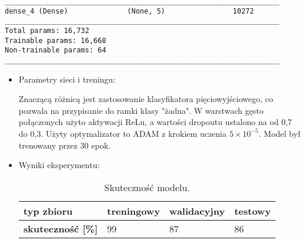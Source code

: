 {\newsavebox\myvff
\begin{lrbox}{\myvff}
\setlength{\myminipagewidth}{0.9\linewidth} %
\setlength{\myminipagecentering}{(\linewidth-\myminipagewidth)/2}
\noindent\hspace{\myminipagecentering}\begin{minipage}{\myminipagewidth}
\begin{verbatim}
_________________________________________________________________
dense_4 (Dense)              (None, 5)                10272     
_________________________________________________________________
Total params: 16,732
Trainable params: 16,668
Non-trainable params: 64
_________________________________________________________________
\end{verbatim} 
\end{minipage}\end{lrbox}
\resizebox{0.75\textwidth}{!}{\usebox\myvff}

\begin{itemize}
\item Parametry sieci i treningu:

Znaczącą różnicą jest zastosowanie klasyfikatora pięciowyjściowego, co pozwala na przypisanie do ramki klasy "żadna". W warstwach gęsto połączonych użyto aktywacji ReLu, a wartości dropoutu ustalono na od 0,7 do 0,3. Użyty optymalizator to ADAM z krokiem uczenia \(5 \times 10^{-5}\). Model był trenowany przez 30 epok.

\item Wyniki eksperymentu:

\begin{table}[h]
\centering
\caption[Short Heading]{Skuteczność modelu.}
\begin{tabular}{|l|l|l|l|}
\hline
\textbf{typ zbioru}           & \textbf{treningowy} & \textbf{walidacyjny} & \textbf{testowy} \\ \hline
\textbf{skuteczność {[}\%{]}} & 99                  & 87                   & 86               \\ \hline
\end{tabular}
\end{table}

\end{itemize}
}
